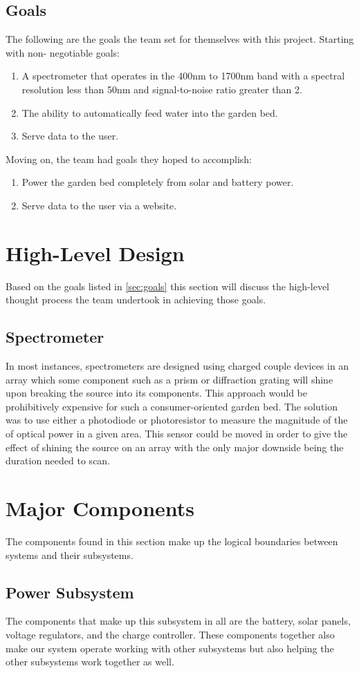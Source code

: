 \documentclass[journal]{IEEEtran}
\begin{document}
\subsection{Goals} \label{sec:goals}
The following are the goals the team set for themselves with this project. Starting with non-
negotiable goals:
\begin{enumerate}
   \item A spectrometer that operates in the 400nm to 1700nm band with a spectral resolution less
         than 50nm and signal-to-noise ratio greater than 2.
   \item The ability to automatically feed water into the garden bed.
   \item Serve data to the user.
\end{enumerate}
Moving on, the team had goals they hoped to accomplish:
\begin{enumerate}
   \item Power the garden bed completely from solar and battery power.
   \item Serve data to the user via a website.
\end{enumerate}
\section{High-Level Design}
Based on the goals listed in \autoref{sec:goals} this section will discuss the high-level thought
process the team undertook in achieving those goals.
\subsection{Spectrometer} 
In most instances, spectrometers are designed using charged couple devices in an array which some
component such as a prism or diffraction grating will shine upon breaking the source into its
components. This approach would be prohibitively expensive for such a consumer-oriented garden
bed. The solution was to use either a photodiode or photoresistor to measure the magnitude of the
of optical power in a given area. This sensor could be moved in order to give the effect of shining
the source on an array with the only major downside being the duration needed to scan. 
\section{Major Components} \label{sec:major-components}
The components found in this section make up the logical boundaries between systems and their
subsystems. 
\subsection{Power Subsystem} \label{sec:power subsystem}
The components that make up this subsystem in all are the battery, solar panels, voltage regulators, 
and the charge controller. These components together also make our system operate working with other 
subsystems but also helping the other subsystems work together as well. 
\end{document}
